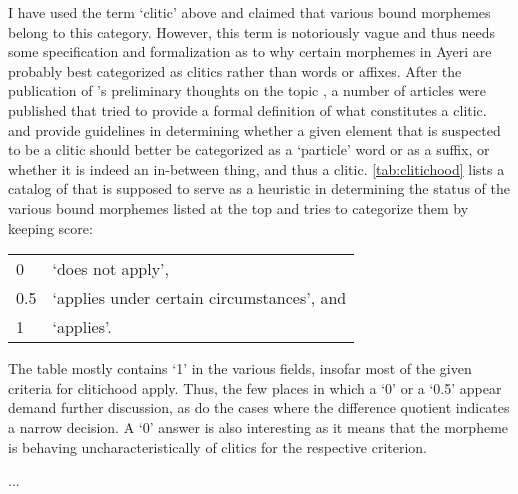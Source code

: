 I have used the term `clitic' above and claimed that various bound morphemes 
belong to this category. However, this term is notoriously vague and thus needs 
some specification and formalization as to why certain morphemes in Ayeri are 
probably best categorized as clitics rather than words or affixes. After the 
publication of \citeauthor{zwicky1977}'s preliminary thoughts on the topic 
\citep{zwicky1977}, a number of articles were published that tried to provide a 
formal definition of what constitutes a clitic. \citet{zwicky1985} and 
\citet{klavans1985} provide guidelines in determining whether a given element 
that is suspected to be a clitic should better be categorized as a `particle' 
word or as a suffix, or whether it is indeed an in-between thing, and thus a 
clitic. \autoref{tab:clitichood} lists a catalog of 
 that is supposed to serve as a 
heuristic in determining the status of the various bound morphemes listed at 
the top and tries to categorize them by keeping score:

\addtocounter{table}{-1}
\begin{longtabu} to .75\linewidth {X[1r] X[4l]}
0 & `does not apply',\\
0.5 & `applies under certain circumstances', and\\
1 & `applies'.
\end{longtabu}

The table mostly contains `1' in the various fields, insofar most of the given 
criteria for clitichood apply. Thus, the few places in which a `0' or a `0.5' 
appear demand further discussion, as do the cases where the difference 
quotient indicates a narrow decision. A `0' answer is also interesting as it 
means that the morpheme is behaving uncharacteristically of clitics for the 
respective criterion.

...

